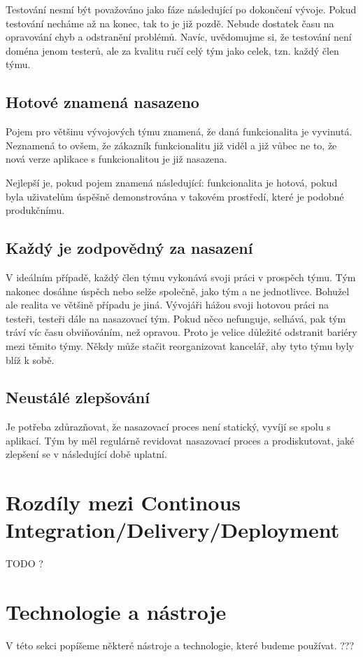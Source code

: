 Testování nesmí být považováno jako fáze následující po dokončení vývoje. Pokud testování necháme až na konec, tak to je již pozdě. Nebude dostatek času na opravování chyb a odstranění problémů. Navíc, uvědomujme si, že testování není doména jenom testerů, ale za kvalitu ručí celý tým jako celek, tzn. každý člen týmu.

\subsection{Hotové znamená nasazeno}
Pojem  pro většinu vývojových týmu znamená, že daná funkcionalita je vyvinutá. Neznamená to ovšem, že zákazník funkcionalitu již viděl a již vůbec ne to, že nová verze aplikace s funkcionalitou je již nasazena. 

Nejlepší je, pokud pojem  znamená následující: funkcionalita je hotová, pokud byla uživatelům úspěšně demonstrována v takovém prostředí, které je podobné produkčnímu. 

\subsection{Každý je zodpovědný za nasazení}
V ideálním případě, každý člen týmu vykonává svoji práci v prospěch týmu. Tým nakonec dosáhne úspěch nebo selže společně, jako tým a ne jednotlivce. Bohužel ale realita ve většině případu je jiná. Vývojáři hážou svoji hotovou práci na testeři, testeři dále na nasazovací tým. Pokud něco nefunguje, selhává, pak tým tráví víc času obviňováním, než opravou. Proto je velice důležité odstranit bariéry mezi těmito týmy. Někdy může stačit reorganizovat kancelář, aby tyto týmu byly blíž k sobě.

\subsection{Neustálé zlepšování}
Je potřeba zdůrazňovat, že nasazovací proces není statický, vyvíjí se spolu s aplikací. Tým by měl regulárně revidovat nasazovací proces a prodiskutovat, jaké zlepšení se v následující době uplatní.

\section{Rozdíly mezi Continous Integration/Delivery/Deployment}
TODO ?

\section{Technologie a nástroje}
V této sekci popíšeme některé nástroje a technologie, které budeme používat. ???

